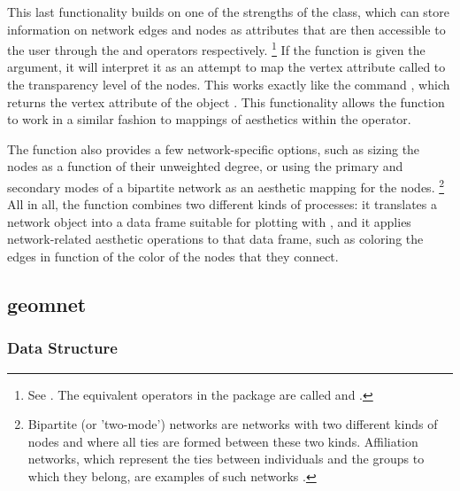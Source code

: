 This last functionality builds on one of the strengths of the  class, which can store %
information on network edges and nodes as attributes that are then accessible to the user through the  and  operators respectively.%
%
\footnote{See \citet[p.~22-24]{network}. The equivalent operators in the  package are called  and .} %
  If the  function is given the  argument, it will interpret it as an attempt to map the vertex attribute called  to the transparency level of the nodes. This works exactly like the command , which returns the vertex attribute  of the  object . %
  This functionality allows the  function to work in a similar fashion to  mappings of aesthetics within the  operator.

The  function also provides a few network-specific options, such as sizing the nodes as a function of their unweighted degree, or using the primary and secondary modes of a bipartite network as an aesthetic mapping for the nodes.%
\footnote{Bipartite (or 'two-mode') networks are networks with two different kinds of nodes and where all ties are formed between these two kinds. Affiliation networks, which represent the ties between individuals and the groups to which they belong, are examples of such networks \citep[see][p.~53-54 and p.~123-127]{newman}.}%
All in all, the  function combines two different kinds of processes: it translates a network object into a data frame suitable for plotting with , and it applies network-related aesthetic operations to that data frame, such as coloring the edges in function of the color of the nodes that they connect. %

\subsection{geomnet} %

\subsubsection{Data Structure}


